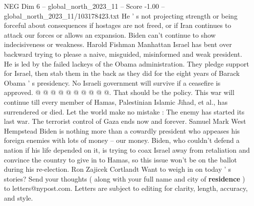 \begin{textsample}{NEG Dim 6 – global\_north\_2023\_11 – Score -1.00 – global\_north\_2023\_11/103178423.txt}
He ' s not projecting strength or being forceful about consequences if hostages are not freed, or if Iran continues to attack our forces or allows an expansion.
Biden can't continue to show indecisiveness or weakness.
Harold Fishman Manhattan Israel has bent over backward trying to please a naive, misguided, misinformed and weak president.
He is led by the failed lackeys of the Obama administration.
They pledge support for Israel, then stab them in the back as they did for the eight years of Barack Obama ' s presidency.
No Israeli government will survive if a ceasefire is approved. @ @ @ @ @ @ @ @ @ @.
That should be the policy.
This war will continue till every member of Hamas, Palestinian Islamic Jihad, et al., has surrendered or died.
Let the world make no mistake : The enemy has started its last war.
The terrorist control of Gaza ends now and forever.
Samuel Mark West Hempstead Biden is nothing more than a cowardly president who appeases his foreign enemies with lots of money -- our money.
Biden, who couldn't defend a nation if his life depended on it, is trying to coax Israel away from retaliation and convince the country to give in to Hamas, so this issue won't be on the ballot during his re-election.
Ron Zajicek Cortlandt Want to weigh in on today ' s stories?
Send your thoughts ( along with your full name and city of \textbf{residence} ) to letters@nypost.com.
Letters are subject to editing for clarity, length, accuracy, and style.

\end{textsample}

